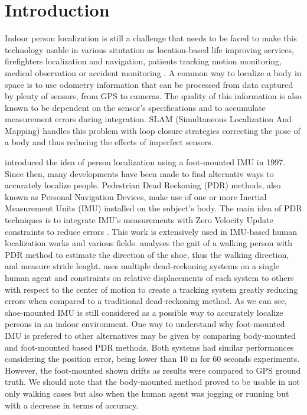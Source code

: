 
\section{Introduction}\label{sec:intro}

Indoor person localization is still a challenge that needs to be faced to make this technology usable in various situtation as location-based life improving services, firefighters localization and navigation, patients tracking 
motion monitoring, medical observation or accident monitoring \cite{pourhomayoun2012spatial}.
A common way to localize a body in space is to use odometry information that can be processed from data captured by plenty of sensors, from GPS to cameras.
The quality of this information is also known to be dependent on the sensor's specifications and to accumulate measurement errors during integration. 
SLAM (Simultaneous Localization And Mapping) handles this problem with loop closure strategies correcting the pose of a body and thus reducing the effects of imperfect sensors.

\cite{hutchings1998system} introduced the idea of person localization using a foot-mounted IMU in 1997. Since then, many developments have been made to find alternativ ways to accurately localize people.
Pedestrian Dead Reckoning (PDR) methods, also known as Personal Navigation Devices, make use of one or more Inertial Measurement Units (IMU) installed on the subject's body.
The main idea of PDR techniques is to integrate IMU's measurements with Zero Velocity Update constraints to reduce errors \cite{ojeda2007personal}.
This work is extensively used in IMU-based human localization works and various fields. \cite{kwanmuang2015phd} analyses the gait of a walking person with PDR method to estimate the direction of the shoe, thus the walking direction, and
measure stride lenght. \cite{jin2011robust} uses multiple dead-reckoning systems on a single human agent and constraints on relative displacements of each system to others with respect to the center of motion to create a tracking system
greatly reducing errors when compared to a traditional dead-reckoning method. As we can see, shoe-mounted IMU is still considered as a possible way to accurately localize persons in an indoor environment. One way to understand why foot-mounted IMU is prefered to other alternatives may be given by \cite{groves2007inertial}
comparing body-mounted and foot-mounted based PDR methods. Both systems had similar performances considering the position error, being lower than 10 m for 60 seconds experiments. However, the foot-mounted shown drifts as results were compared
to GPS ground truth. We should note that the body-mounted method proved to be usable in not only walking cases but also when the human agent was jogging or running but with a decrease in terms of accuracy.

